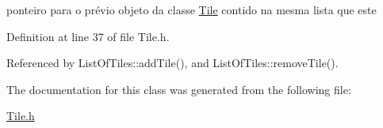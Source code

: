 ponteiro para o prévio objeto da classe \hyperlink{classTile}{Tile} contido na mesma lista que este 



Definition at line 37 of file Tile.\+h.



Referenced by List\+Of\+Tiles\+::add\+Tile(), and List\+Of\+Tiles\+::remove\+Tile().



The documentation for this class was generated from the following file\+:\begin{DoxyCompactItemize}
\item 
\hyperlink{Tile_8h}{Tile.\+h}\end{DoxyCompactItemize}
